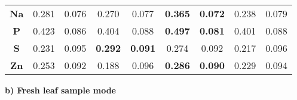 \documentclass{article}
\begin{document}
\begin{table}[h!]
\begin{minipage}[t]{0.49\textwidth}
\begin{tabular}{|c|c|c|c|c|c|c|c|c|}
\textbf{Na} & 0.281 & 0.076 & 0.270 & 0.077 & {\color{blue}\textbf{0.365}} & {\color{blue}\textbf{0.072}} & 0.238 & 0.079 \\
\textbf{P}  & 0.423 & 0.086 & 0.404 & 0.088 & {\color{blue}\textbf{0.497}} & {\color{blue}\textbf{0.081}} & 0.401 & 0.088 \\
\textbf{S}  & 0.231 & 0.095 & {\color{blue}\textbf{0.292}} & {\color{blue}\textbf{0.091}} & 0.274 & 0.092 & 0.217 & 0.096 \\
\textbf{Zn} & 0.253 & 0.092 & 0.188 & 0.096 & {\color{blue}\textbf{0.286}} & {\color{blue}\textbf{0.090}} & 0.229 & 0.094 \\
\hline
\end{tabular}
\end{minipage}
\hfill
\begin{minipage}[t]{0.49\textwidth}
\noindent\textbf{b) Fresh leaf sample mode}

\vspace{0.5em}


\end{minipage}
\end{table}
\end{document}
